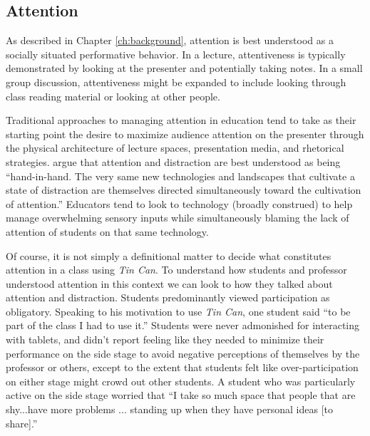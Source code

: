 \subsection{Attention}

As described in Chapter \ref{ch:background}, attention is best understood as a socially situated performative behavior. In a lecture, attentiveness is typically demonstrated by looking at the presenter and potentially taking notes. In a small group discussion, attentiveness might be expanded to include looking through class reading material or looking at other people. 


Traditional approaches to managing attention in education tend to take as their starting point the desire to maximize audience attention on the presenter through the physical architecture of lecture spaces, presentation media, and rhetorical strategies. \citet{Gordon:2009us} argue that attention and distraction are best understood as being ``hand-in-hand. The very same new technologies and landscapes that cultivate a state of distraction are themselves directed simultaneously toward the cultivation of attention.'' Educators tend to look to technology (broadly construed) to help manage overwhelming sensory inputs while simultaneously blaming the lack of attention of students on that same technology.


Of course, it is not simply a definitional matter to decide what constitutes attention in a class using \emph{Tin Can}. To understand how students and professor understood attention in this context we can look to how they talked about attention and distraction. Students predominantly viewed participation as obligatory. Speaking to his motivation to use \emph{Tin Can}, one student said ``to be part of the class I had to use it.'' Students were never admonished for interacting with tablets, and didn't report feeling like they needed to minimize their performance on the side stage to avoid negative perceptions of themselves by the professor or others, except to the extent that students felt like over-participation on either stage might crowd out other students. A student who was particularly active on the side stage worried that ``I take so much space that people that are shy...have more problems ... standing up when they have personal ideas [to share].''

